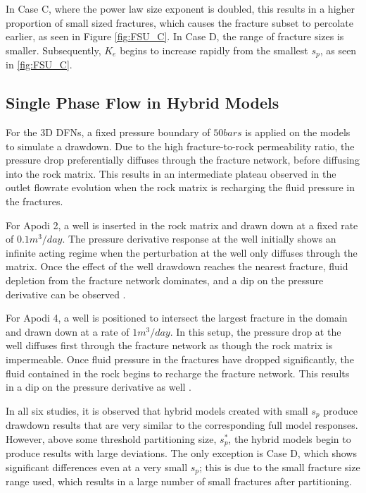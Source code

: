 \documentclass[a4paper]{article}
\begin{document}
In Case C, where the power law size exponent is doubled, this results in a higher proportion of small sized fractures, which causes the fracture subset to percolate earlier, as seen in Figure \ref{fig:FSU_C}. In Case D, the range of fracture sizes is smaller. Subsequently, $K_e$ begins to increase rapidly from the smallest $s_p$, as seen in \ref{fig:FSU_C}. 



\subsection{Single Phase Flow in Hybrid Models}
For the 3D DFNs, a fixed pressure boundary of $50bars$ is applied on the models to simulate a drawdown. Due to the high fracture-to-rock permeability ratio, the pressure drop preferentially diffuses through the fracture network, before diffusing into the rock matrix. This results in an intermediate plateau observed in the outlet flowrate evolution when the rock matrix is recharging the fluid pressure in the fractures.

For Apodi 2, a well is inserted in the rock matrix and drawn down at a fixed rate of $0.1m^3/day$. The pressure derivative response at the well initially shows an infinite acting regime when the perturbation at the well only diffuses through the matrix. Once the effect of the well drawdown reaches the nearest fracture, fluid depletion from the fracture network dominates, and a dip on the pressure derivative can be observed \citep{Bourdet1989, Cinco-Ley1976, Egya2018}.

For Apodi 4, a well is positioned to intersect the largest fracture in the domain and drawn down at a rate of $1m^3/day$. In this setup, the pressure drop at the well diffuses first through the fracture network as though the rock matrix is impermeable. Once fluid pressure in the fractures have dropped significantly, the fluid contained in the rock begins to recharge the fracture network. This results in a dip on the pressure derivative as well \citep{Gringarten1987}.

In all six studies, it is observed that hybrid models created with small $s_p$ produce drawdown results that are very similar to the corresponding full model responses. However, above some threshold partitioning size, $s_p^*$, the hybrid models begin to produce results with large deviations. The only exception is Case D, which shows significant differences even at a very small $s_p$; this is due to the small fracture size range used, which results in a large number of small fractures after partitioning. 
\end{document}
